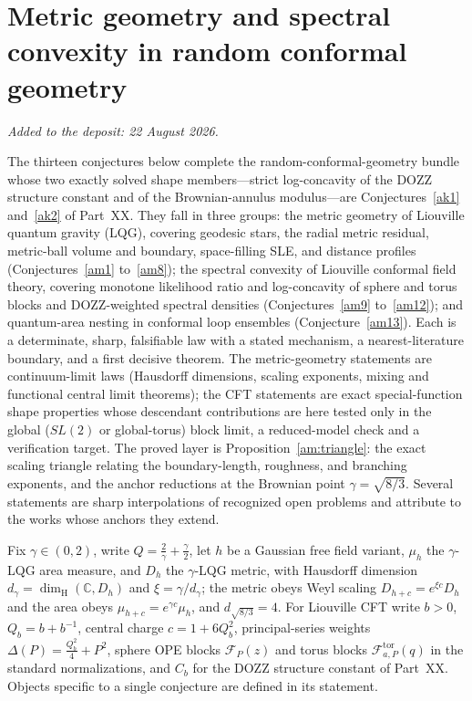 \documentclass[11pt]{article}
\theoremstyle{definition}
\begin{document}
\part{Metric geometry and spectral convexity in random conformal geometry}

\medskip\noindent\emph{Added to the deposit: 22 August 2026.}\par\medskip

The thirteen conjectures below complete the random-conformal-geometry bundle whose two exactly solved shape members---strict log-concavity of the DOZZ structure constant and of the Brownian-annulus modulus---are Conjectures~\ref{ak1} and~\ref{ak2} of Part~XX.  They fall in three groups: the metric geometry of Liouville quantum gravity (LQG), covering geodesic stars, the radial metric residual, metric-ball volume and boundary, space-filling SLE, and distance profiles (Conjectures~\ref{am1} to~\ref{am8}); the spectral convexity of Liouville conformal field theory, covering monotone likelihood ratio and log-concavity of sphere and torus blocks and DOZZ-weighted spectral densities (Conjectures~\ref{am9} to~\ref{am12}); and quantum-area nesting in conformal loop ensembles (Conjecture~\ref{am13}).  Each is a determinate, sharp, falsifiable law with a stated mechanism, a nearest-literature boundary, and a first decisive theorem.  The metric-geometry statements are continuum-limit laws (Hausdorff dimensions, scaling exponents, mixing and functional central limit theorems); the CFT statements are exact special-function shape properties whose descendant contributions are here tested only in the global (\(SL(2)\) or global-torus) block limit, a reduced-model check and a verification target.  The proved layer is Proposition~\ref{am:triangle}: the exact scaling triangle relating the boundary-length, roughness, and branching exponents, and the anchor reductions at the Brownian point \(\gamma=\sqrt{8/3}\).  Several statements are sharp interpolations of recognized open problems and attribute to the works whose anchors they extend.

Fix \(\gamma\in(0,2)\), write \(Q=\tfrac2\gamma+\tfrac\gamma2\), let \(h\) be a Gaussian free field variant, \(\mu_h\) the \(\gamma\)-LQG area measure, and \(D_h\) the \(\gamma\)-LQG metric, with Hausdorff dimension \(d_\gamma=\dim_{\mathrm H}(\mathbb C,D_h)\) and \(\xi=\gamma/d_\gamma\); the metric obeys Weyl scaling \(D_{h+c}=e^{\xi c}D_h\) and the area obeys \(\mu_{h+c}=e^{\gamma c}\mu_h\), and \(d_{\sqrt{8/3}}=4\).  For Liouville CFT write \(b>0\), \(Q_b=b+b^{-1}\), central charge \(c=1+6Q_b^2\), principal-series weights \(\Delta(P)=\tfrac{Q_b^2}4+P^2\), sphere OPE blocks \(\mathcal F_P(z)\) and torus blocks \(\mathcal F^{\mathrm{tor}}_{a,P}(q)\) in the standard normalizations, and \(C_b\) for the DOZZ structure constant of Part~XX.  Objects specific to a single conjecture are defined in its statement.
\end{document}
